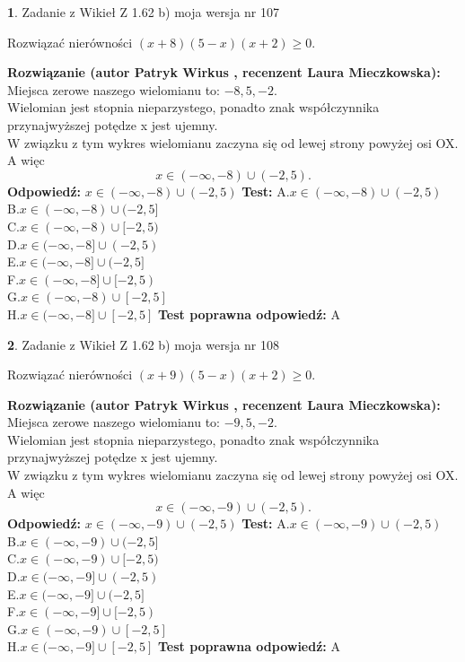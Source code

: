 \documentclass[12pt, a4paper]{article}
\theoremstyle{definition} %
\newtheorem{zad}{}
\newcommand{\zadStart}[1]{\begin{zad}#1\newline}
\newcommand{\zadStop}{\end{zad}}
\newcommand{\rozwStart}[2]{\noindent \textbf{Rozwiązanie (autor #1 , recenzent #2): }\newline}
\newcommand{\rozwStop}{\newline}
\newcommand{\odpStart}{\noindent \textbf{Odpowiedź:}\newline}
\newcommand{\odpStop}{\newline}
\newcommand{\testStart}{\noindent \textbf{Test:}\newline}
\newcommand{\testStop}{\newline}
\newcommand{\kluczStart}{\noindent \textbf{Test poprawna odpowiedź:}\newline}
\newcommand{\kluczStop}{\newline}
\begin{document}
\zadStart{Zadanie z Wikieł Z 1.62 b) moja wersja nr 107}

Rozwiązać nierówności $(x+8)(5-x)(x+2)\ge0$.
\zadStop
\rozwStart{Patryk Wirkus}{Laura Mieczkowska}
Miejsca zerowe naszego wielomianu to: $-8, 5, -2$.\\
Wielomian jest stopnia nieparzystego, ponadto znak współczynnika przy\linebreak najwyższej potędze x jest ujemny.\\ W związku z tym wykres wielomianu zaczyna się od lewej strony powyżej osi OX. A więc $$x \in (-\infty,-8) \cup (-2,5).$$
\rozwStop
\odpStart
$x \in (-\infty,-8) \cup (-2,5)$
\odpStop
\testStart
A.$x \in (-\infty,-8) \cup (-2,5)$\\
B.$x \in (-\infty,-8) \cup (-2,5]$\\
C.$x \in (-\infty,-8) \cup [-2,5)$\\
D.$x \in (-\infty,-8] \cup (-2,5)$\\
E.$x \in (-\infty,-8] \cup (-2,5]$\\
F.$x \in (-\infty,-8] \cup [-2,5)$\\
G.$x \in (-\infty,-8) \cup [-2,5]$\\
H.$x \in (-\infty,-8] \cup [-2,5]$
\testStop
\kluczStart
A
\kluczStop



\zadStart{Zadanie z Wikieł Z 1.62 b) moja wersja nr 108}

Rozwiązać nierówności $(x+9)(5-x)(x+2)\ge0$.
\zadStop
\rozwStart{Patryk Wirkus}{Laura Mieczkowska}
Miejsca zerowe naszego wielomianu to: $-9, 5, -2$.\\
Wielomian jest stopnia nieparzystego, ponadto znak współczynnika przy\linebreak najwyższej potędze x jest ujemny.\\ W związku z tym wykres wielomianu zaczyna się od lewej strony powyżej osi OX. A więc $$x \in (-\infty,-9) \cup (-2,5).$$
\rozwStop
\odpStart
$x \in (-\infty,-9) \cup (-2,5)$
\odpStop
\testStart
A.$x \in (-\infty,-9) \cup (-2,5)$\\
B.$x \in (-\infty,-9) \cup (-2,5]$\\
C.$x \in (-\infty,-9) \cup [-2,5)$\\
D.$x \in (-\infty,-9] \cup (-2,5)$\\
E.$x \in (-\infty,-9] \cup (-2,5]$\\
F.$x \in (-\infty,-9] \cup [-2,5)$\\
G.$x \in (-\infty,-9) \cup [-2,5]$\\
H.$x \in (-\infty,-9] \cup [-2,5]$
\testStop
\kluczStart
A
\kluczStop
\end{document}
